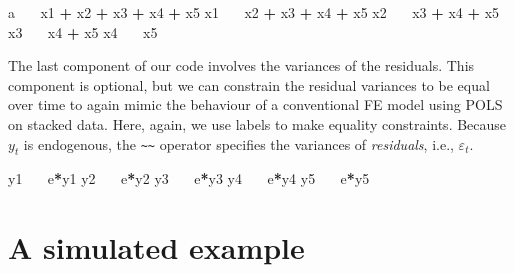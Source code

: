 \documentclass[]{interact}
\theoremstyle{plain}%
\theoremstyle{definition}
\theoremstyle{remark}
\newenvironment{Shaded}{\begin{snugshade}}{\end{snugshade}}
\newcommand{\ErrorTok}[1]{\textcolor[rgb]{0.64,0.00,0.00}{\textbf{#1}}}
\newcommand{\NormalTok}[1]{#1}
\newcommand{\OperatorTok}[1]{\textcolor[rgb]{0.81,0.36,0.00}{\textbf{#1}}}
\newcommand{\StringTok}[1]{\textcolor[rgb]{0.31,0.60,0.02}{#1}}
\begin{document}
\singlespacing

\begin{Shaded}
\begin{Highlighting}[]
\NormalTok{a }\OperatorTok{~}\ErrorTok{~}\StringTok{ }\NormalTok{x1 }\OperatorTok{+}\StringTok{ }\NormalTok{x2 }\OperatorTok{+}\StringTok{ }\NormalTok{x3 }\OperatorTok{+}\StringTok{ }\NormalTok{x4 }\OperatorTok{+}\StringTok{ }\NormalTok{x5}
\NormalTok{x1 }\OperatorTok{~}\ErrorTok{~}\StringTok{ }\NormalTok{x2 }\OperatorTok{+}\StringTok{ }\NormalTok{x3 }\OperatorTok{+}\StringTok{ }\NormalTok{x4 }\OperatorTok{+}\StringTok{ }\NormalTok{x5}
\NormalTok{x2 }\OperatorTok{~}\ErrorTok{~}\StringTok{ }\NormalTok{x3 }\OperatorTok{+}\StringTok{ }\NormalTok{x4 }\OperatorTok{+}\StringTok{ }\NormalTok{x5}
\NormalTok{x3 }\OperatorTok{~}\ErrorTok{~}\StringTok{ }\NormalTok{x4 }\OperatorTok{+}\StringTok{ }\NormalTok{x5}
\NormalTok{x4 }\OperatorTok{~}\ErrorTok{~}\StringTok{ }\NormalTok{x5}
\end{Highlighting}
\end{Shaded}

\doublespacing

The last component of our code involves the variances of the residuals.
This component is optional, but we can constrain the residual variances
to be equal over time to again mimic the behaviour of a conventional FE
model using POLS on stacked data. Here, again, we use labels to make
equality constraints. Because \(y_{t}\) is endogenous, the
\texttt{\textasciitilde{}\textasciitilde{}} operator specifies the
variances of \emph{residuals}, i.e., \(\varepsilon_{t}\).

\singlespacing

\begin{Shaded}
\begin{Highlighting}[]
\NormalTok{y1 }\OperatorTok{~}\ErrorTok{~}\StringTok{ }\NormalTok{e}\OperatorTok{*}\NormalTok{y1}
\NormalTok{y2 }\OperatorTok{~}\ErrorTok{~}\StringTok{ }\NormalTok{e}\OperatorTok{*}\NormalTok{y2}
\NormalTok{y3 }\OperatorTok{~}\ErrorTok{~}\StringTok{ }\NormalTok{e}\OperatorTok{*}\NormalTok{y3}
\NormalTok{y4 }\OperatorTok{~}\ErrorTok{~}\StringTok{ }\NormalTok{e}\OperatorTok{*}\NormalTok{y4}
\NormalTok{y5 }\OperatorTok{~}\ErrorTok{~}\StringTok{ }\NormalTok{e}\OperatorTok{*}\NormalTok{y5}
\end{Highlighting}
\end{Shaded}

\doublespacing

\hypertarget{ex1}{%
\section{A simulated example}\label{ex1}}
\end{document}
